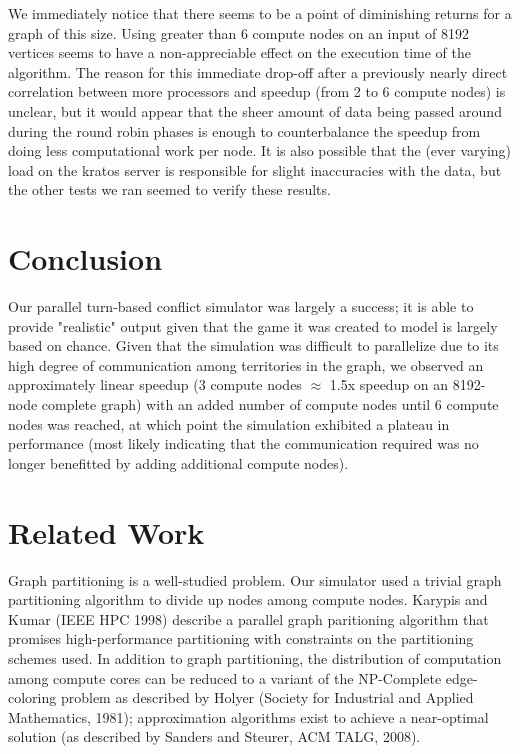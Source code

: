 \documentclass[10pt]{article}
\begin{document}
\begin{multicols}{2}
		We immediately notice that there seems to be a point of diminishing returns for a graph of this size. 
		Using greater than 6 compute nodes on an input of 8192 vertices seems to have a non-appreciable effect on the execution time of the algorithm. The reason for this immediate drop-off after a previously nearly direct correlation between more processors and speedup (from 2 to 6 compute nodes) is unclear, but it would appear that the sheer amount of data being passed around during the round robin phases is enough to counterbalance the speedup from doing less computational work per node. It is also possible that the (ever varying) load on the kratos server is responsible for slight inaccuracies with the data, but the other tests we ran seemed to verify these results.
				
		\section*{Conclusion}
		Our parallel turn-based conflict simulator was largely a success; it is able to provide "realistic" output given that the game it was created to model is largely based on chance.  
		Given that the simulation was difficult to parallelize due to its high degree of communication among territories in the graph, we observed an approximately linear speedup (3 compute nodes $\approx$ 1.5x speedup on an 8192-node complete graph) with an added number of compute nodes until 6 compute nodes was reached, at which point the simulation exhibited a plateau in performance (most likely indicating that the communication required was no longer benefitted by adding additional compute nodes).

		

		\section*{Related Work}
		Graph partitioning is a well-studied problem.  
		Our simulator used a trivial graph partitioning algorithm to divide up nodes among compute nodes.  
		Karypis and Kumar (IEEE HPC 1998) describe a parallel graph paritioning algorithm that promises high-performance partitioning with constraints on the partitioning schemes used.  
		In addition to graph partitioning, the distribution of computation among compute cores can be reduced to a variant of the NP-Complete edge-coloring problem as described by Holyer (Society for Industrial and Applied Mathematics, 1981); approximation algorithms exist to achieve a near-optimal solution (as described by Sanders and Steurer, ACM TALG, 2008).


\end{multicols}
\end{document}
